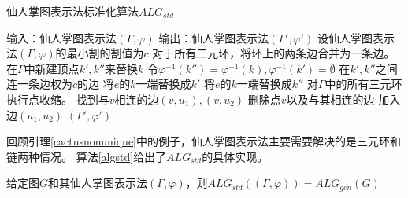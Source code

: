 \begin{algorithm}
  \caption{仙人掌图表示法标准化算法$ALG_{std}$}
  \label{algstd}
  \begin{algorithmic}[1] %
  \Statex 输入：仙人掌图表示法$(\Gamma,\varphi)$
  \Statex 输出：仙人掌图表示法$(\Gamma',\varphi')$
  \State 设仙人掌图表示法$(\Gamma,\varphi)$的最小割的割值为$c$
  \State 对于所有二元环，将环上的两条边合并为一条边。
          \State 在$\Gamma$中新建顶点$k',k''$来替换$k$
          \State 令$\varphi^{-1}(k'')=\varphi^{-1}(k),\varphi^{-1}(k')=\emptyset$
          \State 在$k',k''$之间连一条边权为$c$的边
                \State 将$e$的$k$一端替换成$k'$
                \State 将$e$的$k$一端替换成$k''$
            \EndIf
          \EndFor
      \EndFor
  \EndFor
  \State 对$\Gamma$中的所有三元环执行点收缩。
      \State 找到与$v$相连的边$(v,u_1),(v,u_2)$
          \State 删除点$v$以及与其相连的边
          \State 加入边$(u_1,u_2)$
      \EndIf
  \EndFor
  \State \Return $(\Gamma',\varphi')$
  \end{algorithmic}
\end{algorithm}

回顾引理\ref{cactusnonunique}中的例子，仙人掌图表示法主要需要解决的是三元环和链两种情况。
算法\ref{algstd}给出了$ALG_{std}$的具体实现。

\begin{theorem}
  给定图$G$和其仙人掌图表示法$(\Gamma,\varphi)$，则$ALG_{std}((\Gamma,\varphi))=ALG_{gen}(G)$
\end{theorem}

